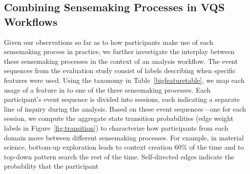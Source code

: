  \subsection{Combining Sensemaking Processes in VQS Workflows}
 Given our observations so far as to  how participants make use of each sensemaking process in practice, we further investigate the interplay between these sensemaking processes in the context of an analysis workflow. %
 The event sequences from the evaluation study
 consist of labels describing when specific features were used.
 Using the taxonomy in Table~\ref{bigfeaturetable}, we map each usage of a feature in \zvpp to one of the three sensemaking processes.
 Each participant's event sequence
 is divided into sessions,
 each indicating a separate line of inquiry
 during the analysis.
 Based on these event sequences---one for each session,
 we compute the aggregate state transition probabilities
 (edge weight labels in Figure~\ref{fig:transition})
 to characterize how participants from each domain
 move between different sensemaking processes.
 For example, in material science,
 bottom-up exploration
 leads to context creation 60\% of the time
 and to top-down pattern search
 the rest of the time.
 Self-directed edges indicate the probability that the participant
